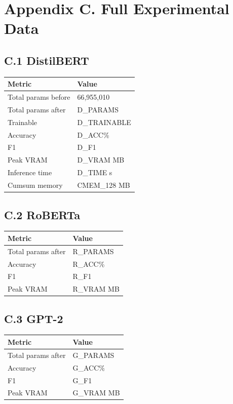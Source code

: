 \section{Appendix C. Full Experimental Data}

\subsection{C.1 DistilBERT}

\begin{table}[H]
\centering
\small
\begin{tabular}{ll}
\toprule
\textbf{Metric} & \textbf{Value} \\
\midrule
Total params before & 66,955,010 \\
Total params after & {{D\_PARAMS}} \\
Trainable & {{D\_TRAINABLE}} \\
Accuracy & {{D\_ACC}}\% \\
F1 & {{D\_F1}} \\
Peak VRAM & {{D\_VRAM}} MB \\
Inference time & {{D\_TIME}} s \\
Cumsum memory & {{CMEM\_128}} MB \\
\bottomrule
\end{tabular}
\end{table}

\subsection{C.2 RoBERTa}

\begin{table}[H]
\centering
\small
\begin{tabular}{ll}
\toprule
\textbf{Metric} & \textbf{Value} \\
\midrule
Total params after & {{R\_PARAMS}} \\
Accuracy & {{R\_ACC}}\% \\
F1 & {{R\_F1}} \\
Peak VRAM & {{R\_VRAM}} MB \\
\bottomrule
\end{tabular}
\end{table}

\subsection{C.3 GPT-2}

\begin{table}[H]
\centering
\small
\begin{tabular}{ll}
\toprule
\textbf{Metric} & \textbf{Value} \\
\midrule
Total params after & {{G\_PARAMS}} \\
Accuracy & {{G\_ACC}}\% \\
F1 & {{G\_F1}} \\
Peak VRAM & {{G\_VRAM}} MB \\
\bottomrule
\end{tabular}
\end{table}

